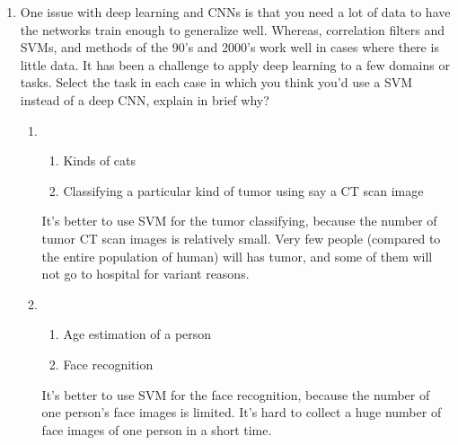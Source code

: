 \documentclass[letterpaper,11pt]{article}
\begin{document}
\begin{enumerate}
\begin{enumerate}
	\end{enumerate}
	\item One issue with deep learning and CNNs is that you need a lot of data to have the networks train enough to generalize well. Whereas, correlation filters and SVMs, and methods of the 90's and 2000's work well in cases where there is little data. It has been a challenge to apply deep learning to a few domains or tasks. Select the task in each case in which you think you'd use a SVM instead of a deep CNN, explain in brief why?
	\begin{enumerate}
		\item 
		\begin{enumerate}
			\item Kinds of cats
			\item Classifying a particular kind of tumor using say a CT scan image
		\end{enumerate}
		It's better to use SVM for the tumor classifying, because the number of tumor CT scan images is relatively small. Very few people (compared to the entire population of human) will has tumor, and some of them will not go to hospital for variant reasons.
		\item 
		\begin{enumerate}
			\item Age estimation of a person
			\item Face recognition
		\end{enumerate}
		It's better to use SVM for the face recognition, because the number of one person's face images is limited. It's hard to collect a huge number of face images of one person in a short time.
	\end{enumerate}
\end{enumerate}
\end{document}
